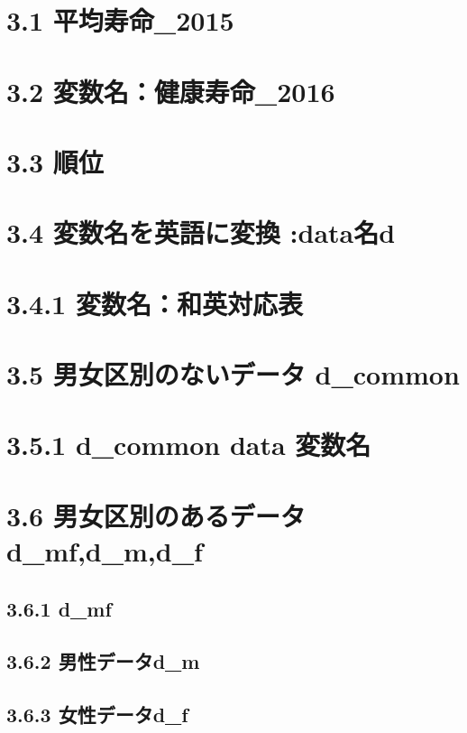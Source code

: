 \section{3.1 平均寿命\_2015}


\section{3.2 変数名：健康寿命\_2016}



\section{3.3 順位}


\section{3.4 変数名を英語に変換 :data名d}


\section{3.4.1 変数名：和英対応表}




\section{3.5 男女区別のないデータ d\_common}

\section{3.5.1 d\_common data 変数名}


\section{3.6 男女区別のあるデータ d\_mf,d\_m,d\_f}

\subsection{3.6.1 d\_mf}



\subsection{3.6.2 男性データd\_m}


\subsection{3.6.3 女性データd\_f}



